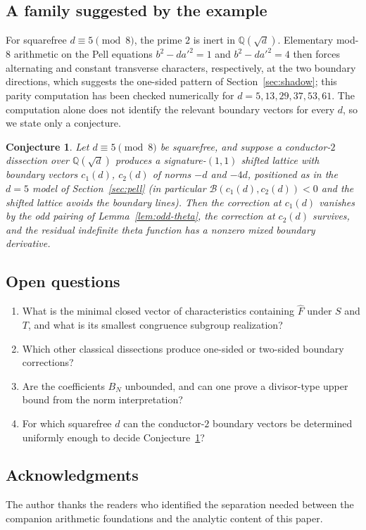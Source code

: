 \documentclass[12pt]{amsart}
\newtheorem{conjecture}[theorem]{Conjecture}
\theoremstyle{definition}
\theoremstyle{remark}
\newcommand{\QQ}{\mathbb{Q}}
\begin{document}
\subsection{A family suggested by the example}
For squarefree $d\equiv5\pmod8$, the prime $2$ is inert in
$\QQ(\sqrt d)$.  Elementary mod-$8$ arithmetic on the Pell equations
$b^2-da'^2=1$ and $b^2-da'^2=4$ then forces alternating and constant
transverse characters, respectively, at the two boundary directions,
which suggests the one-sided pattern of Section~\ref{sec:shadow};
this parity computation has been checked numerically for
$d=5,13,29,37,53,61$.  The computation alone does not identify the
relevant boundary vectors for every $d$, so we state only a
conjecture.

\begin{conjecture}\label{conj:family}
Let $d\equiv5\pmod8$ be squarefree, and suppose a conductor-$2$
dissection over $\QQ(\sqrt d)$ produces a signature-$(1,1)$ shifted
lattice with boundary vectors $c_1(d)$, $c_2(d)$ of norms $-d$ and
$-4d$, positioned as in the $d=5$ model of
Section~\ref{sec:pell} (in particular
$\mathcal B(c_1(d),c_2(d))<0$ and the shifted lattice avoids the
boundary lines).  Then the correction at $c_1(d)$ vanishes by the odd
pairing of Lemma~\ref{lem:odd-theta}, the correction at $c_2(d)$
survives, and the residual indefinite theta function has a nonzero
mixed boundary derivative.
\end{conjecture}

\subsection{Open questions}
\begin{enumerate}
\item What is the minimal closed vector of characteristics containing
$\widehat F$ under $S$ and $T$, and what is its smallest congruence
subgroup realization?
\item Which other classical dissections produce one-sided or two-sided
boundary corrections?
\item Are the coefficients $B_N$ unbounded, and can one prove a
divisor-type upper bound from the norm interpretation?
\item For which squarefree $d$ can the conductor-$2$ boundary vectors
be determined uniformly enough to decide Conjecture~\ref{conj:family}?
\end{enumerate}

\subsection*{Acknowledgments}
The author thanks the readers who identified the separation needed
between the companion arithmetic foundations and the analytic content
of this paper.



\end{document}
